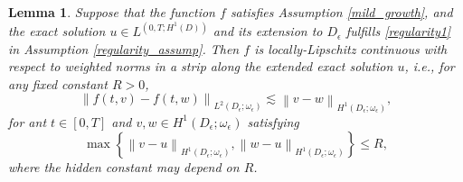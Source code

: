 \documentclass[3p,times]{elsarticle}
\newtheorem{lemma}{Lemma}[section]
\numberwithin{equation}{section}
\begin{document}
\begin{lemma}
	\label{locally}
	Suppose that the function $f$ satisfies Assumption \ref{mild_growth}, and the exact solution $u\in L^(0,T;H^1(D))$ and its extension to $D_{\epsilon}$ fulfills \eqref{regularity1} in Assumption \ref{regularity_assump}. Then $f$ is locally-Lipschitz continuous with respect to weighted norms in a strip along the extended exact solution $u$, i.e., for any fixed constant $R>0$,
	\begin{equation}
		\label{locally_eq}
		\left\|f(t,v)-f(t,w)\right\|_{L^2(D_{\epsilon};\omega_{\epsilon})}\lesssim \left\|v-w\right\|_{H^1(D_{\epsilon};\omega_{\epsilon})},
	\end{equation}
	for ant $t \in [0,T]$ and $v,w\in H^1(D_{\epsilon};\omega_{\epsilon})$ satisfying
	\begin{equation}
		\label{locally_eq2}
		\max\left\{\left\|v-u\right\|_{H^1(D_{\epsilon};\omega_{\epsilon})},\left\|w-u\right\|_{H^1(D_{\epsilon};\omega_{\epsilon})} \right\}\leq R,
	\end{equation}
	where the hidden constant may depend on $R$.
	
\end{lemma}
\end{document}
